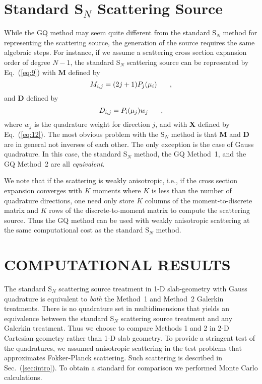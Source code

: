 \documentclass[12pt]{article}
\newcommand{\be}{\begin{equation}}
\newcommand{\ee}{\end{equation}}
\newcommand{\pec}{\hspace{0.25in},}
\newcommand{\LEQ}[1]{\label{eq:#1}}
\newcommand{\EQ}[1]{Eq.~(\ref{eq:#1})}
\newcommand{\mD}{\mathbf{D}}
\newcommand{\mM}{\mathbf{M}}
\newcommand{\mX}{\mathbf{X}}
\begin{document}
\begin{center}
\section{Standard S$_N$ Scattering Source}

While the GQ method may seem quite different from the standard S$_N$ method for representing the scattering 
source, the generation of the source requires the same algebraic steps.  For instance, if we assume a scattering 
cross section expansion order of degree $N-1$, the standard S$_N$ scattering source can be represented by \EQ{9} with 
$\mM$ defined by 
\be
M_{i,j} = (2j+1) P_j(\mu_i) \pec
\LEQ{32a}
\ee
and $\mD$ defined by 
\be
D_{i,j} = P_i(\mu_j) w_j \pec
\LEQ{32b}
\ee
where $w_j$ is the quadrature weight for direction $j$, and with $\mX$ defined by \EQ{12}. 
The most obvious problem with the S$_N$ method is that $\mM$ and $\mD$ are in general not inverses of each other.  
The only exception is the case of Gauss quadrature.  In this case, the standard S$_N$ method, the GQ Method~1, and the GQ Method~2 
are all {\it equivalent}. 

We note that if the scattering is weakly anisotropic, i.e., if the cross section expansion converges with 
$K$ moments where $K$ is less than the number of quadrature directions, one need only store $K$ columns of the moment-to-discrete matrix and 
$K$ rows of the discrete-to-moment matrix to compute the scattering source.  Thus the GQ method can be used with 
weakly anisotropic scattering at the same computational cost as the standard S$_N$ method. 

\section{COMPUTATIONAL RESULTS}
The standard S$_N$ scattering source treatment in 1-D slab-geometry with Gauss quadrature is equivalent to {\em both} the Method~1 and Method~2 
Galerkin treatments.  There is no quadrature set in multidimensions that yields an equivalence between the standard S$_N$ scattering source 
treatment and any Galerkin treatment.  Thus we choose to compare Methods 1 and 2 in 2-D Cartesian geometry rather than 1-D slab geometry. 
To provide a stringent test of the quadratures, we assumed anisotropic scattering in the test problems that approximates Fokker-Planck scattering.  Such scattering is described in Sec.~(\ref{sec:intro}). To obtain a standard for comparison we performed Monte Carlo calculations. 



\end{center}
\end{document}
